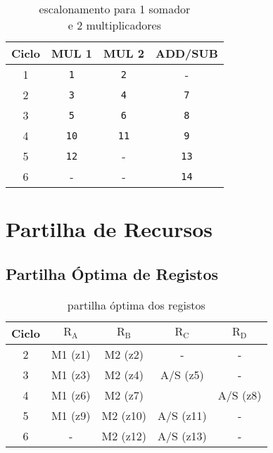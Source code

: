 \documentclass[a4paper]{article}
\begin{document}
\begin{table}[H]
\centering
\begin{tabular}{|c||c|c|c|}
\hline 
Ciclo & MUL 1 & MUL 2 & ADD/SUB \\ 
\hline
\hline 
1 & \texttt{1} & \texttt{2} & - \\ 
\hline 
2 & \texttt{3} & \texttt{4} & \texttt{7} \\ 
\hline 
3 & \texttt{5} & \texttt{6} & \texttt{8} \\ 
\hline 
4 & \texttt{10} & \texttt{11} & \texttt{9} \\ 
\hline 
5 & \texttt{12} & - & \texttt{13} \\ 
\hline 
6 & - & - & \texttt{14} \\ 
\hline 
\end{tabular} 
\caption{escalonamento para 1 somador \\
e 2 multiplicadores}
\label{tab:escalonamento2M1AS}
\end{table}


\section{Partilha de Recursos}
\subsection{Partilha Óptima de Registos}
\label{subsec:partilha_optim_registos}

\begin{table}[H]
\centering
\begin{tabular}{|c||c|c|c|c|}
\hline 
Ciclo & $\mathrm{R_A}$ & $\mathrm{R_B}$ & $\mathrm{R_C}$ & $\mathrm{R_D}$ \\ 
\hline 
\hline
2 & M1 (z1) & M2 (z2) & - & - \\ 
\hline 
3 & M1 (z3) & M2 (z4) & A/S (z5) & - \\ 
\cline{1-3}\cline{5-5}
4 & M1 (z6) & M2 (z7) &  & A/S (z8) \\ 
\hline 
5 & M1 (z9) & M2 (z10) & A/S (z11) & - \\ 
\hline 
6 & - & M2 (z12) & A/S (z13) & - \\ 
\hline 
\end{tabular}
\caption{partilha óptima dos registos}
\label{tab:binding_optim_reg}
\end{table}
\end{document}

